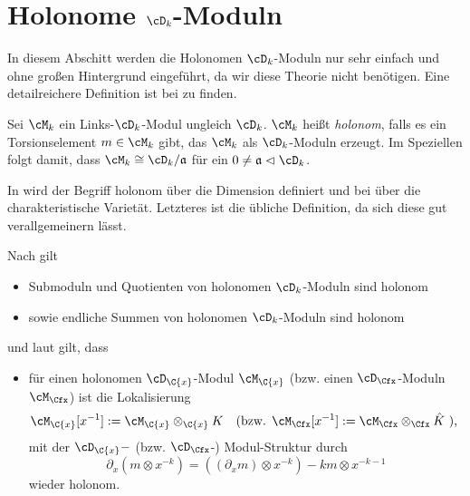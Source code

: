 \section{Holonome $\cD_k$-Moduln}
In diesem Abschitt werden die Holonomen $\cD_k$-Moduln nur sehr einfach und
ohne großen Hintergrund eingeführt, da wir diese Theorie nicht benötigen. Eine
detailreichere Definition ist bei \cite[Def. 3.3.1]{sabbah_cimpa90} zu finden.
\begin{defn}
Sei $\cM_k$ ein Links-$\cD_k$-Modul ungleich $\cD_k$. $\cM_k$ heißt
\emph{holonom}, falls es ein Torsionselement $m\in\cM_k$ gibt, das $\cM_k$ als
$\cD_k$-Moduln erzeugt. Im Speziellen folgt damit, dass $\cM_k\cong
\cD_k/\mathfrak{a}$ für ein $0\neq\mathfrak{a}\vartriangleleft\cD_k$.
\end{defn}
\begin{bem}
\begin{comment}
Dies hier ist eine sehr vereinfachte, aber für unsere Zwecke völlig
ausreichende, Definition von holonom.
\end{comment}
In \cite{coutinho1995primer} wird der Begriff holonom über die Dimension
definiert und bei \cite{sabbah_cimpa90} über die charakteristische Varietät.
Letzteres ist die übliche Definition, da sich diese gut verallgemeinern lässt.
\end{bem}

\begin{bem} 
Nach \cite[Prop 10.1.1]{coutinho1995primer} gilt
\begin{itemize}
\item Submoduln und Quotienten von holonomen $\cD_k$-Moduln sind holonom
\item sowie endliche Summen von holonomen $\cD_k$-Moduln sind holonom
\end{itemize}
und laut \cite[Thm. 4.2.3]{sabbah_cimpa90} gilt, dass
\begin{itemize}
\item für einen holonomen $\cD_{\C\{x\}}$-Modul $\cM_{\C\{x\}}$
(bzw. einen $\cD_{\Cfx}$-Moduln $\cM_{\Cfx}$)
ist die Lokalisierung
\begin{align*}
\cM_{\C\{x\}}[x^{-1}]&:=\cM_{\C\{x\}}\otimes_{\C\{x\}}K
&&\text{(bzw. }\cM_{\Cfx}[x^{-1}]:=\cM_{\Cfx}\otimes_{\Cfx}\hat K\text{ ),}
\end{align*}
mit der $\cD_{\C\{x\}}-$ (bzw. $\cD_{\Cfx}$-) Modul-Struktur durch
\[
\partial_x(m\otimes x^{-k})=((\partial_xm)\otimes x^{-k})-km\otimes x^{-k-1}
\]
wieder holonom.
\end{itemize}
\end{bem}


